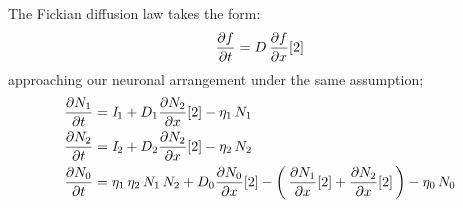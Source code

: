 \documentclass[class={myRUCProject}, crop=false]{standalone}
\begin{document}
The Fickian diffusion law takes the form:
\begin{equation}
    \pde{t}{f} = D\,\pde{x}{f}[2]
\end{equation}
approaching our neuronal arrangement under the same assumption;
\begin{align}
    \pde{t}{N_1} &= \curr_1 + D_1\pde{x}{N_2}[2] - \eta_1\,N_1 \\
    \pde{t}{N_2} &= \curr_2 + D_2\pde{x}{N_2}[2] - \eta_2\,N_2 \\
    \pde{t}{N_0} &= \eta_1\,\eta_2\,N_1\,N_2 + D_0\pde{x}{N_0}[2] - \br{\pde{x}{N_1}[2]+\pde{x}{N_2}[2]} - \eta_0\,N_0
\end{align}


\end{document}

